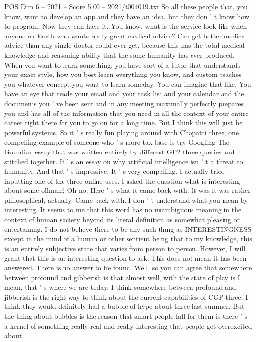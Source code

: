 \begin{textsample}{POS Dim 6 – 2021 – Score 5.00 – 2021/t004019.txt}
So all these people that, you know, want to develop an app and they have an idea, but they don ' t know how to program.
Now they can have it.
You know, what is the service look like when anyone on Earth who wants really great medical advice?
Can get better medical advice than any single doctor could ever get, because this has the total medical knowledge and reasoning ability that the some humanity has ever produced.
When you want to learn something, you have sort of a tutor that understands your exact style, how you best learn everything you know, and custom teaches you whatever concept you want to learn someday.
You can imagine that like.
You have an eye that reads your email and your task list and your calendar and the documents you ' ve been sent and in any meeting maximally perfectly prepares you and has all of the information that you need in all the context of your entire career right there for you to go on for a long time.
But I think this will just be powerful systems.
So it ' s really fun playing around with Chapatti three, one compelling example of someone who ' s more tax base is try Googling The Guardian essay that was written entirely by different GP2 three queries and stitched together.
It ' s an essay on why artificial intelligence isn ' t a threat to humanity.
And that ' s impressive.
It ' s very compelling.
I actually tried inputting one of the three online uses.
I asked the question what is interesting about some ollman?
Oh no.
Here ' s what it came back with.
It was it was rather philosophical, actually.
Came back with.
I don ' t understand what you mean by interesting.
It seems to me that this word has no unambiguous meaning in the context of human society beyond its literal definition as somewhat pleasing or entertaining.
I do not believe there to be any such thing as INTERESTINGNESS except in the mind of a human or other sentient being that to my knowledge, this is an entirely subjective state that varies from person to person.
However, I will grant that this is an interesting question to ask.
This does not mean it has been answered.
There is no answer to be found.
Well, so you can agree that somewhere between profound and gibberish is that almost well, with the state of play is I mean, that ' s where we are today.
I think somewhere between profound and jibberish is the right way to think about the current capabilities of CGP three.
I think they would definitely had a bubble of hype about three last summer.
But the thing about bubbles is the reason that smart people fall for them is there ' s a kernel of something really real and really interesting that people get overexcited about.

\end{textsample}
